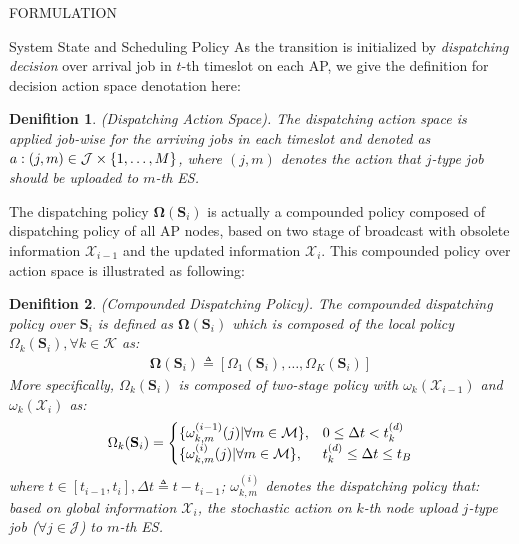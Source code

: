 \documentclass[10pt, conference, letterpaper]{IEEEtran}
\newtheorem{definition}{Denifition}
\newcommand{\define}{\triangleq}
\renewcommand{\vec}{\mathbf}
\DeclarePairedDelimiter{\set}{\{}{\}}
\newcommand{\apSet}{\mathcal{K}}
\newcommand{\esSet}{\mathcal{M}}
\newcommand{\jSpace}{\mathcal{J}}
\newcommand{\Stat}{\mathbf{S}}
\newcommand{\Obsv}{\mathcal{X}}
\newcommand{\Policy}{\mathbf{\Omega}}
\begin{document}
\begin{section}{FORMULATION}
\begin{subsection}{System State and Scheduling Policy}
            As the transition is initialized by \emph{dispatching decision} over arrival job in $t$-th timeslot on each AP, we give the definition for decision action space denotation here:
            \begin{definition}
                (Dispatching Action Space).
                The dispatching action space is applied job-wise for the arriving jobs in each timeslot and denoted as $a: (j, m) \in \jSpace \times \set{1,\dots,M}$, where $(j, m)$ denotes the action that $j$-type job should be uploaded to $m$-th ES.
            \end{definition}

            The dispatching policy $\vec{\Omega}(\Stat_i)$ is actually a compounded policy composed of dispatching policy of all AP nodes, based on two stage of broadcast with obsolete information $\Obsv_{i-1}$ and the updated information $\Obsv_{i}$. This compounded policy over action space is illustrated as following:
            \begin{definition}(Compounded Dispatching Policy).
                The compounded dispatching policy over $\Stat_{i}$ is defined as $\Policy(\Stat_{i})$ which is composed of the local policy $\Omega_k(\Stat_{i}), \forall k\in\apSet$ as:
                \begin{align}
                    \vec{\Omega}(\Stat_{i}) \define [\Omega_1(\Stat_{i}), \dots, \Omega_K(\Stat_{i})]
                \end{align}
                More specifically, $\Omega_k(\Stat_{i})$ is composed of two-stage policy with $\omega_k(\Obsv_{i-1})$ and $\omega_k(\Obsv_{i})$ as:
                \begin{align}
                    \Omega_k(\Stat_i) = 
                    \begin{cases}
                        \set{\omega^{(i-1)}_{k,m}(j)|\forall m\in\esSet}, & 0 \leq \Delta{t} < t^{(d)}_k
                        \\
                        \set{\omega^{(i)}_{k,m}(j)|\forall m\in\esSet}, & t^{(d)}_k \leq \Delta{t} \leq t_B
                    \end{cases}
                \end{align}
                where $t\in[t_{i-1}, t_{i}], \Delta{t} \define t - t_{i-1}$; $\omega^{(i)}_{k,m}$ denotes the dispatching policy that: based on global information $\Obsv_{i}$, the stochastic action on $k$-th node upload $j$-type job ($\forall j\in\jSpace$) to $m$-th ES.
            \end{definition}
        \end{subsection}


\end{section}
\end{document}
